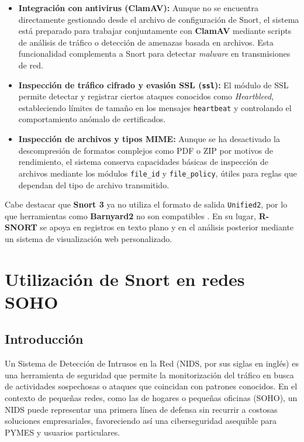 \documentclass[11pt,a4paper,twoside]{report}
\begin{document}
\begin{itemize}
	\item \textbf{Integración con antivirus (ClamAV):}  
	Aunque no se encuentra directamente gestionado desde el archivo de configuración de Snort, el sistema está preparado para trabajar conjuntamente con \textbf{ClamAV} mediante scripts de análisis de tráfico o detección de amenazas basada en archivos. Esta funcionalidad complementa a Snort para detectar \textit{malware} en transmisiones de red.
	
	\item \textbf{Inspección de tráfico cifrado y evasión SSL (\texttt{ssl}):}  
	El módulo de SSL permite detectar y registrar ciertos ataques conocidos como \textit{Heartbleed}, estableciendo límites de tamaño en los mensajes \texttt{heartbeat} y controlando el comportamiento anómalo de certificados.
	
	\item \textbf{Inspección de archivos y tipos MIME:}  
	Aunque se ha desactivado la descompresión de formatos complejos como PDF o ZIP por motivos de rendimiento, el sistema conserva capacidades básicas de inspección de archivos mediante los módulos \texttt{file\_id} y \texttt{file\_policy}, útiles para reglas que dependan del tipo de archivo transmitido.
\end{itemize}

Cabe destacar que \textbf{Snort 3} ya no utiliza el formato de salida \texttt{Unified2}, por lo que herramientas como \textbf{Barnyard2} no son compatibles \cite{snort_gui_update}. En su lugar, \textbf{R-SNORT} se apoya en registros en texto plano y en el análisis posterior mediante un sistema de visualización web personalizado.

\chapter{Utilización de Snort en redes SOHO}
\section{Introducción}

Un Sistema de Detección de Intrusos en la Red (NIDS, por sus siglas en inglés) es una herramienta de seguridad que permite la monitorización del tráfico en busca de actividades sospechosas o ataques que coincidan con patrones conocidos. En el contexto de pequeñas redes, como las de hogares o pequeñas oficinas (SOHO), un NIDS puede representar una primera línea de defensa sin recurrir a costosas soluciones empresariales, favoreciendo así una ciberseguridad asequible para PYMES y usuarios particulares.\newline
\end{document}
